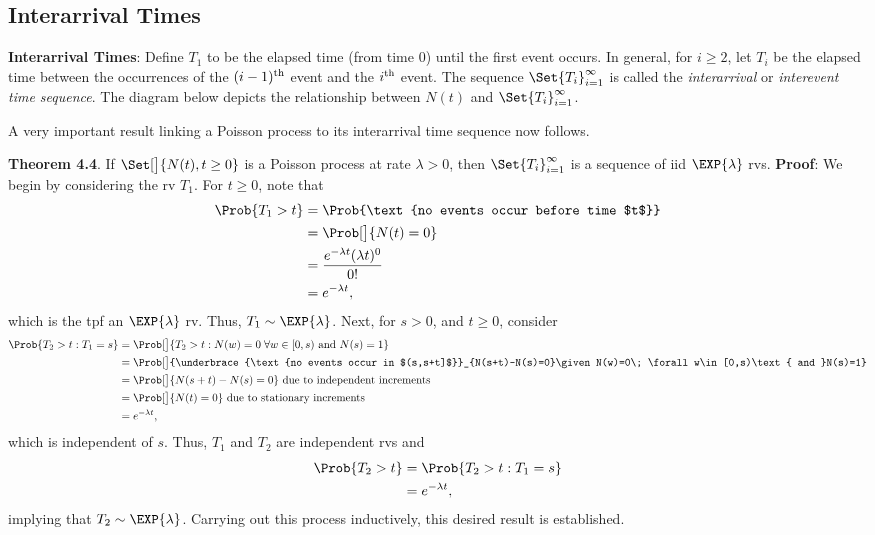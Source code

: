\subsection*{Interarrival Times}
\begin{Regular}
    \textbf{Interarrival Times}: Define $ T_1 $ to be the elapsed time (from time $0$) until the first event occurs.
    In general, for $ i\ge 2 $, let $ T_i $ be the elapsed time between the occurrences of the $ (i-1)\textsuperscript{th} $
    event and the $ i\textsuperscript{th} $ event. The sequence $ \Set{T_i}_{i=1}^\infty $ is called the \emph{interarrival} or
    \emph{interevent time sequence}. The diagram below depicts the relationship between $ N(t) $ and $ \Set{T_i}_{i=1}^\infty $.
\end{Regular}
A very important result linking a Poisson process to its interarrival time sequence now follows.
\begin{Result}
    \textbf{Theorem 4.4}. If $ \Set[\big]{N(t),t\ge 0} $ is a Poisson process at rate $ \lambda>0 $, then $ \Set{T_i}_{i=1}^\infty $
    is a sequence of iid $ \EXP{\lambda} $ rvs.
    \tcblower{}
    \textbf{Proof}: We begin by considering the rv $ T_1 $. For $ t\ge 0 $, note that
    \begin{align*}
        \Prob{T_1>t}
         & =\Prob{\text{no events occur before time $t$}} \\
         & =\Prob[\big]{N(t)=0}                           \\
         & =\frac{e^{-\lambda t}(\lambda t)^0}{0!}        \\
         & =e^{-\lambda t},
    \end{align*}
    which is the tpf an $ \EXP{\lambda} $ rv. Thus, $ T_1 \sim \EXP{\lambda} $.
    Next, for $ s>0 $, and $ t\ge 0 $, consider
    \begin{align*}
        \Prob{T_2>t\given T_1=s}
         & =\Prob[\big]{T_2>t\given N(w)=0\; \forall w\in[0,s)\text{ and }N(s)=1}                                                            \\
         & =\Prob[\big]{\underbrace{\text{no events occur in $(s,s+t]$}}_{N(s+t)-N(s)=0}\given N(w)=0\; \forall w\in[0,s)\text{ and }N(s)=1} \\
         & =\Prob[\big]{N(s+t)-N(s)=0}\text{ due to independent increments}                                                                  \\
         & =\Prob[\big]{N(t)=0}\text{ due to stationary increments}                                                                          \\
         & =e^{-\lambda t},
    \end{align*}
    which is independent of $ s $. Thus, $ T_1 $ and $ T_2 $ are independent rvs and
    \begin{align*}
        \Prob{T_2>t}
         & =\Prob{T_2>t\given T_1=s} \\
         & =e^{-\lambda t},
    \end{align*}
    implying that $ T_2 \sim \EXP{\lambda} $. Carrying out this process inductively,
    this desired result is established.
\end{Result}
